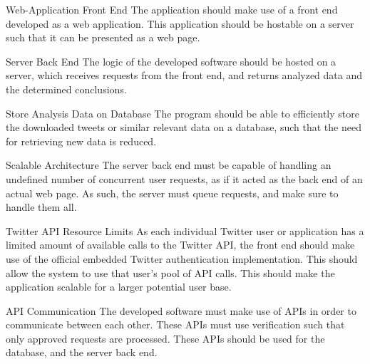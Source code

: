 \begin{requirement}{Web-Application Front End}
The application should make use of a front end developed as a web application.
This application should be hostable on a server such that it can be presented as
a web page.
\end{requirement}

\begin{requirement}{Server Back End}
The logic of the developed software should be hosted on a server, which receives
requests from the front end, and returns analyzed data and the determined
conclusions.
\end{requirement}

\begin{requirement}{Store Analysis Data on Database}
The program should be able to efficiently store the downloaded tweets or
similar relevant data on a database, such that the need for retrieving new data
is reduced.
\end{requirement}

\begin{requirement}{Scalable Architecture}
The server back end must be capable of handling an undefined number of
concurrent user requests, as if it acted as the back end of an actual web page. As such,
the server must queue requests, and make sure to handle them all.
\end{requirement}

\begin{requirement}{Twitter API Resource Limits}
As each individual Twitter user or application has a limited amount of available
calls to the Twitter API, the front end should make use of the official
embedded Twitter authentication implementation. This should allow the system to
use that user's pool of API calls. This should make the application scalable for
a larger potential user base.
\end{requirement}

\begin{requirement}{\ac{API} Communication}
The developed software must make use of \ac{API}s in order to communicate between
each other. These \ac{API}s must use verification such that only approved
requests are processed. These \ac{API}s should be used for the database, and the server back
end.
\end{requirement}






